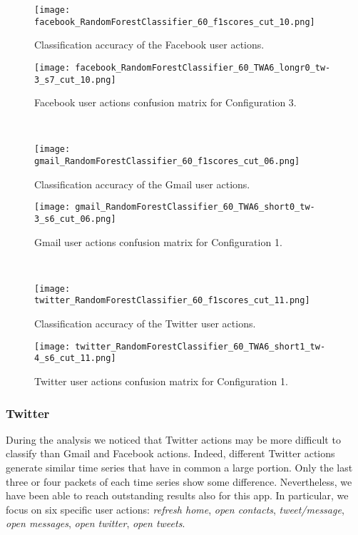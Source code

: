 \documentclass{acm_proc_article-sp}
\begin{document}
\begin{figure*}
        \centering
        \begin{minipage}[t]{0.45\textwidth}
    \texttt{[image: facebook\_RandomForestClassifier\_60\_f1scores\_cut\_10.png]}
	\caption{Classification accuracy of the Facebook user actions.}
	\label{fig:facebookperf}
        \end{minipage}\hfill
        \begin{minipage}[t]{0.45\textwidth}
              \centering
\texttt{[image: facebook\_RandomForestClassifier\_60\_TWA6\_longr0\_tw-3\_s7\_cut\_10.png]}
  \caption{Facebook user actions confusion matrix for Configuration 3.}
  \label{fig:facebookconfusion}  
        \end{minipage}\\
\begin{minipage}[t]{0.45\textwidth}
	  \centering
	\texttt{[image: gmail\_RandomForestClassifier\_60\_f1scores\_cut\_06.png]}
	  \caption{Classification accuracy of the Gmail user actions.}
	  \label{fig:gmailperf}
        \end{minipage}
        \hfill
        \begin{minipage}[t]{0.45\textwidth}
                \centering
\texttt{[image: gmail\_RandomForestClassifier\_60\_TWA6\_short0\_tw-3\_s6\_cut\_06.png]}
    \caption{Gmail user actions confusion matrix for Configuration 1.}
    \label{fig:gmailconfusion}    
        \end{minipage}
        \\
        \begin{minipage}[t]{0.45\textwidth}
	  \centering
      \texttt{[image: twitter\_RandomForestClassifier\_60\_f1scores\_cut\_11.png]}
	  \caption{Classification accuracy of the Twitter user actions.}
	  \label{fig:twitterperf}
        \end{minipage}
	\hfill
	\begin{minipage}[t]{0.45\textwidth}
      \centering
\texttt{[image: twitter\_RandomForestClassifier\_60\_TWA6\_short1\_tw-4\_s6\_cut\_11.png]}
  \caption{Twitter user actions confusion matrix for Configuration 1.}
  \label{fig:twitterconfusion}           
        \end{minipage}
\end{figure*}

\subsubsection{Twitter}
\label{ClassPerf:Twitter}
During the analysis we noticed that Twitter actions may be more 
difficult to classify than Gmail and Facebook actions. Indeed, different 
Twitter actions generate similar time series that have in common a large 
portion. Only the last three or four packets of each time series show some 
difference. Nevertheless, we have been able to reach outstanding results also 
for this app. In particular, we focus on six specific user actions: \emph{refresh 
home}, \emph{open contacts}, \emph{tweet/message},  \emph{open messages}, 
\emph{open twitter}, \emph{open tweets}. 
\end{document}
